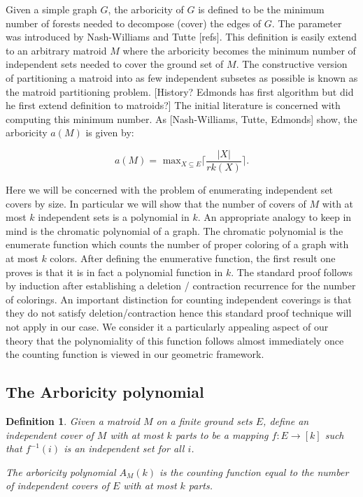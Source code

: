 \documentclass[12pt,reqno]{amsart}
\newtheorem{definition}{Definition}
\numberwithin{definition}{section}
\theoremstyle{definition}
\begin{document}
Given a simple graph $G$, the arboricity of $G$ is defined to be the
minimum number of forests needed to decompose (cover) the edges of
$G$.  The parameter was introduced by Nash-Williams and Tutte [refs].
This definition is easily extend to an arbitrary matroid $M$ where the
arboricity becomes the minimum number of independent sets needed to
cover the ground set of $M$.  The constructive version of partitioning
a matroid into as few independent subsetes as possible is known as the
matroid partitioning problem. [History?  Edmonds has first algorithm
  but did he first extend definition to matroids?]  The initial
literature is concerned with computing this minimum number.  As
[Nash-Williams, Tutte, Edmonds] show, the arboricity $a(M)$ is given
by:

$$ a(M) = \textrm{ max}_{X\subseteq E} \lceil { \frac{|X|}{rk(X)}} \rceil . $$

Here we will be concerned with the problem of enumerating independent
set covers by size.  In particular we will show that the number of
covers of $M$ with at most $k$ independent sets is a polynomial in
$k$.  An appropriate analogy to keep in mind is the chromatic
polynomial of a graph.  The chromatic polynomial is the enumerate
function which counts the number of proper coloring of a graph with at
most $k$ colors.  After defining the enumerative function, the first
result one proves is that it is in fact a polynomial function in $k$.
The standard proof follows by induction after establishing a deletion
/ contraction recurrence for the number of colorings.  An important
distinction for counting independent coverings is that they do not
satisfy deletion/contraction hence this standard proof technique will
not apply in our case.  We consider it a particularly appealing aspect
of our theory that the polynomiality of this function follows almost
immediately once the counting function is viewed in our geometric
framework.

\subsection{The Arboricity polynomial}

\begin{definition} Given a matroid $M$ on a finite ground sets $E$, define an independent cover of $M$ with at most $k$ parts to be a mapping $f : E \rightarrow [k]$ such that $f^{-1}(i)$ is an independent set for all $i$.  

  The arboricity polynomial $A_M(k)$ is the counting function equal to the number of independent covers of $E$ with at most $k$ parts.
\end{definition}
\end{document}

